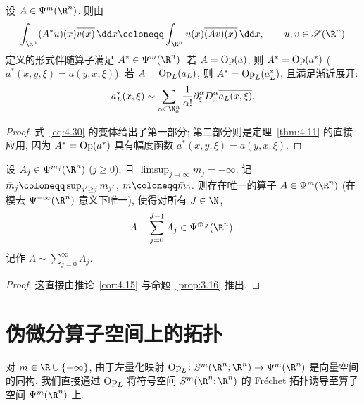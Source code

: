 \begin{corollary}[伪微分算子的伴随算子]\label{cor:4.18}
设 $A \in \Psi^m(\R^n)$. 则由
\begin{equation}\label{eq:4.82}
    \int_{\R^n} (A^* u)(x) \overline{v(x)} \,\dd x \defeq \int_{\R^n} u(x) \overline{(A v)(x)} \,\dd x, \qquad u, v \in \Schwartz(\R^n)
\end{equation}
定义的形式伴随算子满足 $A^* \in \Psi^m(\R^n)$. 若 $A = \operatorname{Op}(a)$, 则 $A^* = \operatorname{Op}(a^*)$ ($a^*(x, y, \xi) = \overline{a(y, x, \xi)}$). 若 $A = \operatorname{Op}_L(a_L)$, 则 $A^* = \operatorname{Op}_L(a_L^*)$, 且满足渐近展开:
\begin{equation}\label{eq:4.83}
    a_L^*(x, \xi) \sim \sum_{\alpha \in \N_0^n} \frac{1}{\alpha!} \partial_\xi^\alpha D_x^\alpha \overline{a_L(x, \xi)}.
\end{equation}
\end{corollary}

\begin{proof}
式~\eqref{eq:4.30} 的变体给出了第一部分; 第二部分则是定理~\ref{thm:4.11} 的直接应用, 因为 $A^* = \operatorname{Op}(a^*)$ 具有幅度函数 $a^*(x, y, \xi) = \overline{a(y, x, \xi)}$.
\end{proof}

\begin{corollary}[伪微分算子的渐近求和]\label{cor:4.19}
设 $A_j \in \Psi^{m_j}(\R^n)$ ($j \ge 0$), 且 $\limsup_{j\to\infty} m_j = -\infty$. 记 $\bar{m}_j \defeq \sup_{j' \ge j} m_{j'}$, $m \defeq \bar{m}_0$. 则存在唯一的算子 $A \in \Psi^m(\R^n)$ (在模去 $\Psi^{-\infty}(\R^n)$ 意义下唯一), 使得对所有 $J \in \N$,
\begin{equation}\label{eq:4.84}
    A - \sum_{j=0}^{J-1} A_j \in \Psi^{\bar{m}_J}(\R^n).
\end{equation}
记作 $A \sim \sum_{j=0}^\infty A_j$.
\end{corollary}

\begin{proof}
这直接由推论~\ref{cor:4.15} 与命题~\ref{prop:3.16} 推出.
\end{proof}

\section{伪微分算子空间上的拓扑}\label{sec:4.3}
%

对 $m \in \R \cup \{-\infty\}$, 由于左量化映射 $\Op_L \colon S^m(\R^n; \R^n) \to \Psi^m(\R^n)$ 是向量空间的同构, 我们直接通过 $\operatorname{Op}_L$ 将符号空间 $S^m(\R^n; \R^n)$ 的 Fréchet 拓扑诱导至算子空间 $\Psi^m(\R^n)$ 上.

